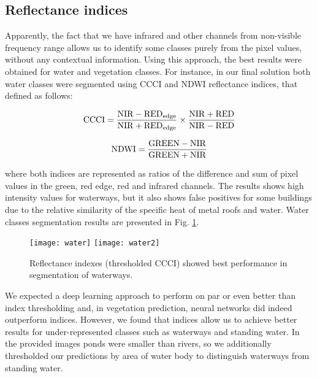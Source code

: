 \documentclass[10pt,twocolumn,letterpaper]{article}
\begin{document}
\subsection{Reflectance indices}
\label{subsec:reflectance}

Apparently, the fact that we have infrared and other channels from non-visible frequency range allows us to identify some classes purely from the pixel values, without any contextual information. Using this approach, the best results were obtained for water and vegetation classes. For instance, in our final solution both water classes were segmented using CCCI \cite{ccci} and NDWI reflectance indices, that defined as follows:

\begin{equation}
{\rm CCCI} = \frac{{\rm NIR} - {\rm RED}_{\rm edge}}{{\rm NIR} + {\rm RED}_{\rm edge}}\times{\frac{{\rm NIR} + {\rm RED}}{{\rm NIR} - {\rm RED}}}
\end{equation}

\begin{equation}
{\rm NDWI} = \frac{{\rm GREEN} - {\rm NIR}}{{\rm GREEN} + {\rm NIR}}
\end{equation}

\noindent where both indices are represented as ratios of the difference and sum of pixel values in the green, red edge, red and infrared channels. The results shows high intensity values for waterways, but it also shows false positives for some buildings due to the relative similarity of the specific heat of metal roofs and water. Water classes segmentation results are presented in Fig. \ref{fig:ccci}.

\begin{figure}[!h]
	\captionsetup{justification=centering}
	\centering
	\texttt{[image: water]}
	\texttt{[image: water2]}
	\caption{ Reflectance indexes (thresholded CCCI) showed best performance in segmentation of waterways.}
	\label{fig:ccci}
\end{figure}

We expected a deep learning approach to perform on par or even better than index thresholding and, in vegetation prediction, neural networks did indeed outperform indices. However, we found that indices allow us to achieve better results for under-represented classes such as waterways and standing water. In the provided images ponds were smaller than rivers, so we additionally thresholded our predictions by area of water body to distinguish waterways from standing water.
\end{document}
